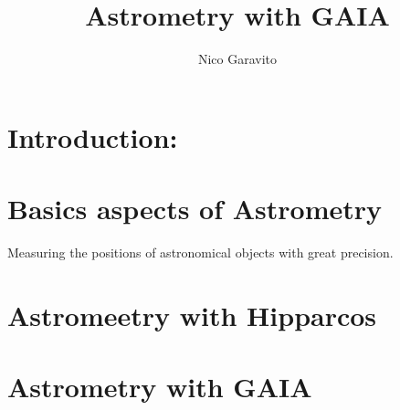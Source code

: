 \documentclass[14pt]{article}
\title{Astrometry with GAIA}
\author{Nico Garavito}
\begin{document}
\maketitle

\section{Introduction:}

\section{Basics aspects of Astrometry}

Measuring the positions of astronomical objects with great precision.

\section{Astromeetry with Hipparcos}

\section{Astrometry with GAIA}
\end{document}
